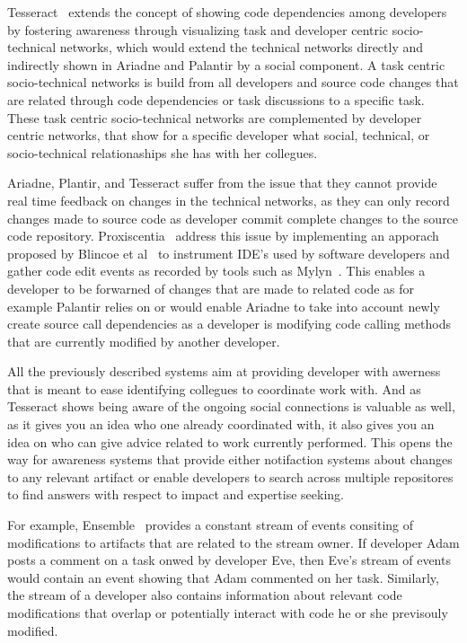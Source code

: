 Tesseract~\cite{} extends the concept of showing code dependencies among developers by fostering awareness through visualizing task and developer centric socio-technical networks, which would extend the technical networks directly and indirectly shown in Ariadne and Palantir by a social component.
A task centric socio-technical networks is build from all developers and source code changes that are related through code dependencies or task discussions to a specific task.
These task centric socio-technical networks are complemented by developer centric networks, that show for a specific developer what social, technical, or socio-technical relationaships she has with her collegues.

Ariadne, Plantir, and Tesseract suffer from the issue that they cannot provide real time feedback on changes in the technical networks, as they can only record changes made to source code as developer commit complete changes to the source code repository. 
Proxiscentia~\cite{} address this issue by implementing an apporach proposed by Blincoe et al~\cite{} to instrument IDE's used by software developers and gather code edit events as recorded by tools such as Mylyn~\cite{}.
This enables a developer to be forwarned of changes that are made to related code as for example Palantir relies on or would enable Ariadne to take into account newly create source call dependencies as a developer is modifying code calling methods that are currently modified by another developer.

All the previously described systems aim at providing developer with awerness that is meant to ease identifying collegues to coordinate work with.
And as Tesseract shows being aware of the ongoing social connections is valuable as well, as it gives you an idea who one already coordinated with, it also gives you an idea on who can give advice related to work currently performed.
This opens the way for awareness systems that provide either notifaction systems about changes to any relevant artifact or enable developers to search across multiple repositores to find answers with respect to impact and expertise seeking.

For example, Ensemble~\cite{} provides a constant stream of events consiting of modifications to artifacts that are related to the stream owner.
If developer Adam posts a comment on a task onwed by developer Eve, then Eve's stream of events would contain an event showing that Adam commented on her task.
Similarly, the stream of a developer also contains information about relevant code modifications that overlap or potentially interact with code he or she previsouly modified.

